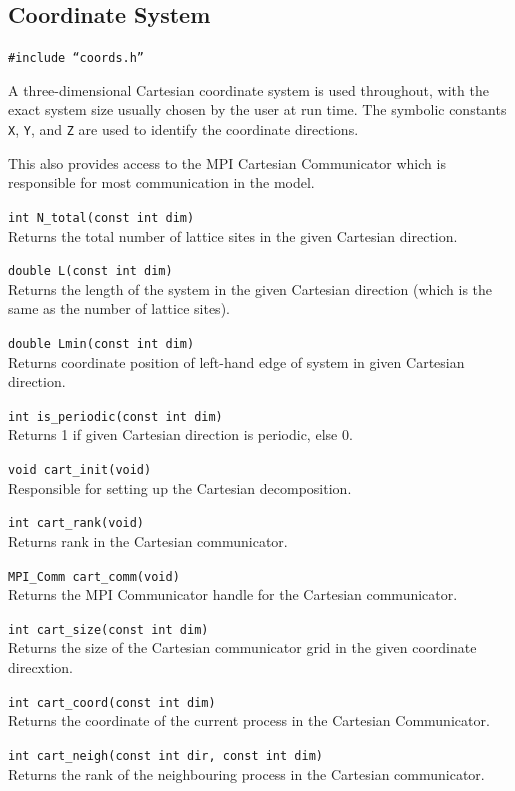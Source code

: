 \subsection{Coordinate System}

\texttt{\#include ``coords.h''}

A three-dimensional Cartesian coordinate system is used throughout,
with the exact system size usually chosen by the user at run time.
The symbolic constants \texttt{X}, \texttt{Y}, and \texttt{Z} are
used to identify the coordinate directions.

This also provides access to the MPI Cartesian Communicator which
is responsible for most communication in the model.

\texttt{int N\_total(const int dim)}\\
Returns the total number of lattice sites in the given Cartesian direction.

\texttt{double L(const int dim)}\\
Returns the length of the system in the given Cartesian direction
(which is the same as the number of lattice sites).

\texttt{double Lmin(const int dim)}\\
Returns coordinate position of left-hand edge of system in given
Cartesian direction.

\texttt{int is\_periodic(const int dim)}\\
Returns 1 if given Cartesian direction is periodic, else 0.

\texttt{void cart\_init(void)}\\
Responsible for setting up the Cartesian decomposition.

\texttt{int cart\_rank(void)}\\
Returns rank in the Cartesian communicator.

\texttt{MPI\_Comm cart\_comm(void)}\\
Returns the MPI Communicator handle for the Cartesian communicator.

\texttt{int cart\_size(const int dim)}\\
Returns the size of the Cartesian communicator grid in the given
coordinate direcxtion.

\texttt{int cart\_coord(const int dim)}\\
Returns the coordinate of the current process in the Cartesian
Communicator.

\texttt{int cart\_neigh(const int dir, const int dim)}\\
Returns the rank of the neighbouring process in the
Cartesian communicator.


